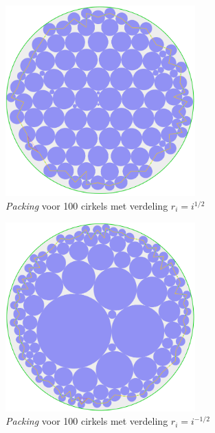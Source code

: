 \documentclass[12pt,a4paper,oneside]{book}
\begin{document}
{%

\begin{figure}
  \centering
  \includegraphics[width=0.65\textwidth]{packing-1div2-100.png}
  \caption{\textit{Packing} voor 100 cirkels met verdeling $r_i=i^{1/2}$}
\end{figure}

\begin{figure}
  \centering
  \includegraphics[width=0.65\textwidth]{packing-neg1div2-100.png}
  \caption{\textit{Packing} voor 100 cirkels met verdeling $r_i=i^{-1/2}$}
\end{figure}

}
\end{document}
